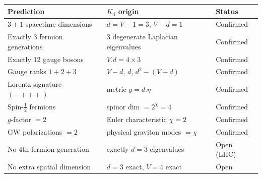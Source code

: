 \documentclass[11pt,a4paper]{book}
\def\cdot{.}%
\begin{document}
\begin{center}
\begin{tabular}{lll}
\toprule
\textbf{Prediction} & \textbf{$K_4$ origin} & \textbf{Status} \\
\midrule
$3 + 1$ spacetime dimensions & $d = V - 1 = 3$, $V - d = 1$ & Confirmed \\
Exactly 3 fermion generations & 3 degenerate Laplacian eigenvalues & Confirmed \\
Exactly 12 gauge bosons & $V \cdot d = 4 \times 3$ & Confirmed \\
Gauge ranks $1 + 2 + 3$ & $V - d$, $d$, $d^2 - (V - d)$ & Confirmed \\
Lorentz signature $(- + + +)$ & metric $g = d \cdot \eta$ & Confirmed \\
Spin-$\tfrac{1}{2}$ fermions & spinor dim $= 2^\chi = 4$ & Confirmed \\
$g$-factor $= 2$ & Euler characteristic $\chi = 2$ & Confirmed \\
GW polarizations $= 2$ & physical graviton modes $= \chi$ & Confirmed \\
No 4th fermion generation & exactly $d = 3$ eigenvalues & Open (LHC) \\
No extra spatial dimension & $d = 3$ exact, $V = 4$ exact & Open \\
\bottomrule
\end{tabular}
\end{center}
\end{document}

